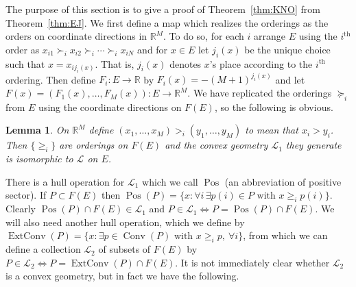 \documentclass[12pt]{elsarticle}
\theoremstyle{plain}
\newtheorem{lemma}{Lemma}
\theoremstyle{definition}
\newcommand{\cgeom}{\mathcal{L}}
\DeclareMathOperator{\ExtHull}{ExtConv}
\DeclareMathOperator{\Hull}{Conv}
\DeclareMathOperator{\Pos}{Pos}
\begin{document}
The purpose of this section is to give a proof of Theorem~\ref{thm:KNO} from Theorem~\ref{thm:EJ}.  We first define a map which realizes the orderings as the orders on coordinate directions in $\mathbb{R}^{M}$.  To do so, for each $i$ arrange $E$ using the $i^{\text{th}}$ order as $x_{i1}\succ_{i}x_{i2}\succ_{i}\dotsm\succ_{i}x_{iN}$ and for $x\in E$ let $j_{i}(x)$ be the unique choice such that $x=x_{ij_{i}(x)}$. That is, $j_i(x)$ denotes $x$'s place according to the $i^{\text{th}}$ ordering. Then define $F_{i}:E\to\mathbb{R}$ by $F_{i}(x)=-(M+1)^{j_{i}(x)}$ and let $F(x)=(F_{1}(x),\dotsc,F_{M}(x)):E\to\mathbb{R}^{M}$.  We have replicated the orderings $\succcurlyeq_{i}$ from $E$ using the coordinate directions on $F(E)$, so the following is obvious.
\begin{lemma}
On $\mathbb{R}^{M}$ define $(x_{1},\dotsc,x_{M})>_{i}(y_{1},\dotsc,y_{M})$ to mean that $x_{i}>y_{i}$.  Then $\{\geq_{i}\}$ are orderings on $F(E)$ and the convex geometry $\cgeom_{1}$ they generate is isomorphic to $\cgeom$ on $E$.
\end{lemma}

There is a hull operation for $\cgeom_{1}$ which we call $\Pos$ (an abbreviation of positive sector).  If $P\subset F(E)$  then $\Pos(P)=\{x: \forall i\, \exists p(i)\in P \text{ with } x\geq_{i}p(i) \}$.  Clearly $\Pos(P)\cap F(E)\in\cgeom_{1}$ and $P\in\cgeom_{1} \iff P=\Pos(P)\cap F(E)$.  We will also need another hull operation, which we define by $\ExtHull(P)=\{x:\exists p\in\Hull(P)\text{ with } x\geq_{i}p,\ \forall i\}$, from which we can define a collection $\cgeom_{2}$  of subsets of $F(E)$ by $P\in\cgeom_{2}\iff P=\ExtHull(P)\cap F(E)$.  It is not immediately clear whether $\cgeom_{2}$ is a convex geometry, but in fact we have the following.
\end{document}
